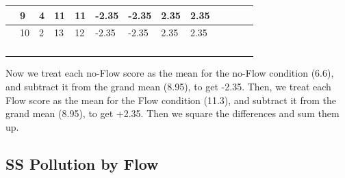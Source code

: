 \documentclass[
  letterpaper,
  DIV=11,
  numbers=noendperiod]{scrreprt}
\begin{document}
\begin{table}
\begin{tabular}{l|l|l|l|l|l|l|l|l|>{}l|>{}l|>{}l|>{}l}
\hline
 & 9 & 4 & 11 & 11 & -2.35 & -2.35 & 2.35 & 2.35 & \cellcolor{yellow}{5.5225} & \cellcolor{yellow}{5.5225} & \cellcolor{yellow}{5.5225} & \cellcolor{yellow}{5.5225}\\
\hline
 & 10 & 2 & 13 & 12 & -2.35 & -2.35 & 2.35 & 2.35 & \cellcolor{yellow}{5.5225} & \cellcolor{yellow}{5.5225} & \cellcolor{yellow}{5.5225} & \cellcolor{yellow}{5.5225}\\
\hline
\cellcolor{lightgray}{Means} & \cellcolor{lightgray}{9.6} & \cellcolor{lightgray}{3.6} & \cellcolor{lightgray}{12.6} & \cellcolor{lightgray}{10} & \cellcolor{lightgray}{} & \cellcolor{lightgray}{} & \cellcolor{lightgray}{} & \cellcolor{lightgray}{} & \cellcolor{yellow}{} & \cellcolor{yellow}{} & \cellcolor{yellow}{} & \cellcolor{yellow}{}\\
\hline
\cellcolor{lightgray}{Grand Mean} & \cellcolor{lightgray}{8.95} & \cellcolor{lightgray}{Low Flow} & \cellcolor{lightgray}{6.6} & \cellcolor{lightgray}{High Flow} & \cellcolor{lightgray}{11.3} & \cellcolor{lightgray}{} & \cellcolor{lightgray}{} & \cellcolor{lightgray}{} & \cellcolor{yellow}{} & \cellcolor{yellow}{} & \cellcolor{yellow}{} & \cellcolor{yellow}{}\\
\hline
\cellcolor{yellow}{sums} & \cellcolor{yellow}{} & \cellcolor{yellow}{} & \cellcolor{yellow}{} & \cellcolor{yellow}{} & \cellcolor{yellow}{} & \cellcolor{yellow}{} & \cellcolor{yellow}{} & \cellcolor{yellow}{Sums} & \cellcolor{yellow}{27.6125} & \cellcolor{yellow}{27.6125} & \cellcolor{yellow}{27.6125} & \cellcolor{yellow}{27.6125}\\
\hline
\cellcolor{yellow}{SS Flow} & \cellcolor{yellow}{} & \cellcolor{yellow}{} & \cellcolor{yellow}{} & \cellcolor{yellow}{} & \cellcolor{yellow}{} & \cellcolor{yellow}{} & \cellcolor{yellow}{} & \cellcolor{yellow}{SS Flow} & \cellcolor{yellow}{110.45} & \cellcolor{yellow}{} & \cellcolor{yellow}{} & \cellcolor{yellow}{}\\
\hline
\end{tabular}
\end{table}

Now we treat each no-Flow score as the mean for the no-Flow condition
(6.6), and subtract it from the grand mean (8.95), to get -2.35. Then,
we treat each Flow score as the mean for the Flow condition (11.3), and
subtract it from the grand mean (8.95), to get +2.35. Then we square the
differences and sum them up.

\subsection{SS Pollution by Flow}\label{ss-pollution-by-flow}
\end{document}
